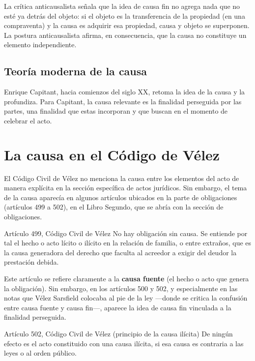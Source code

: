 \documentclass[12pt,oneside]{book}
\begin{document}
La crítica anticausalista señala que la idea de causa fin no agrega nada que no esté ya detrás del objeto: si el objeto es la transferencia de la propiedad (en una compraventa) y la causa es adquirir esa propiedad, causa y objeto se superponen. La postura anticausalista afirma, en consecuencia, que la causa no constituye un elemento independiente.

\subsection{Teoría moderna de la causa}

Enrique Capitant, hacia comienzos del siglo XX, retoma la idea de la causa y la profundiza. Para Capitant, la causa relevante es la finalidad perseguida por las partes, una finalidad que estas incorporan y que buscan en el momento de celebrar el acto.

\section{La causa en el Código de Vélez}

El Código Civil de Vélez no menciona la causa entre los elementos del acto de manera explícita en la sección específica de actos jurídicos. Sin embargo, el tema de la causa aparecía en algunos artículos ubicados en la parte de obligaciones (artículos 499 a 502), en el Libro Segundo, que se abría con la sección de obligaciones.

\begin{definition}{Artículo 499, Código Civil de Vélez}
No hay obligación sin causa. Se entiende por tal el hecho o acto lícito o ilícito en la relación de familia, o entre extraños, que es la causa generadora del derecho que faculta al acreedor a exigir del deudor la prestación debida.
\end{definition}

Este artículo se refiere claramente a la \textbf{causa fuente} (el hecho o acto que genera la obligación). Sin embargo, en los artículos 500 y 502, y especialmente en las notas que Vélez Sarsfield colocaba al pie de la ley —donde se critica la confusión entre causa fuente y causa fin—, aparece la idea de causa fin vinculada a la finalidad perseguida.

\begin{definition}{Artículo 502, Código Civil de Vélez (principio de la causa ilícita)}
De ningún efecto es el acto constituido con una causa ilícita, si esa causa es contraria a las leyes o al orden público.
\end{definition}
\end{document}

